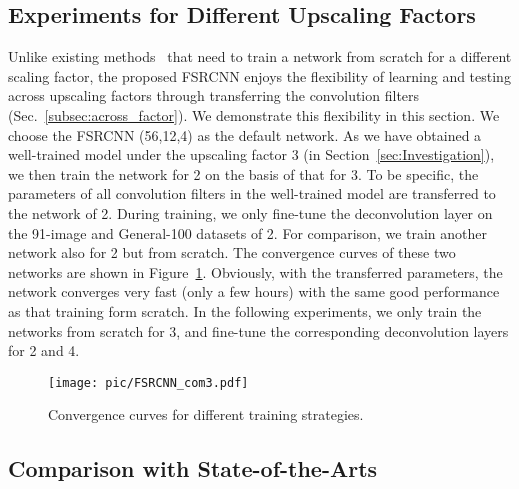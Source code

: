 \documentclass[runningheads]{llncs}
\begin{document}
\subsection{Experiments for Different Upscaling Factors}
\label{sec:transfer}

Unlike existing methods~\cite{Dong2014,Dong2015} that need to train a network from scratch for a different scaling factor, the proposed FSRCNN enjoys the flexibility of learning and testing across upscaling factors through transferring the convolution filters (Sec.~\ref{subsec:across_factor}). We demonstrate this flexibility in this section.
We choose the FSRCNN (56,12,4) as the default network. As we have obtained a well-trained model under the upscaling factor 3 (in Section~\ref{sec:Investigation}), we then train the network for 2 on the basis of that for 3. To be specific, the parameters of all convolution filters in the well-trained model are transferred to the network of 2. During training, we only fine-tune the deconvolution layer on the 91-image and General-100 datasets of 2. For comparison, we train another network also for 2 but from scratch. The convergence curves of these two networks are shown in Figure~\ref{fig:upscalingfactor}. Obviously, with the transferred parameters, the network converges very fast (only a few hours) with the same good performance as that training form scratch.
In the following experiments, we only train the networks from scratch for 3, and fine-tune the corresponding deconvolution layers for 2 and 4.

\begin{figure}[t]\footnotesize
\centering
  \texttt{[image: pic/FSRCNN\_com3.pdf]}
\caption{Convergence curves for different training strategies.}
\label{fig:upscalingfactor}
\end{figure}




\subsection{Comparison with State-of-the-Arts}
\label{subsec:sota}
\end{document}
